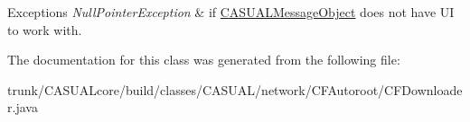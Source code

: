 \begin{DoxyExceptions}{Exceptions}
{\em Null\-Pointer\-Exception} & if \hyperlink{class_c_a_s_u_a_l_1_1_c_a_s_u_a_l_message_object}{C\-A\-S\-U\-A\-L\-Message\-Object} does not have U\-I to work with. \\
\hline
\end{DoxyExceptions}


The documentation for this class was generated from the following file\-:\begin{DoxyCompactItemize}
\item 
trunk/\-C\-A\-S\-U\-A\-Lcore/build/classes/\-C\-A\-S\-U\-A\-L/network/\-C\-F\-Autoroot/C\-F\-Downloader.\-java\end{DoxyCompactItemize}
